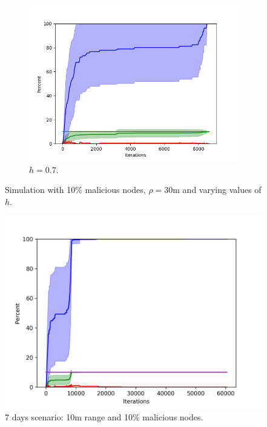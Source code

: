 \begin{figure}
\begin{subfigure}{0.5\textwidth}
\includegraphics[width=\linewidth]{images/plots/thresholds/07_30_10}
\caption{$h = 0.7$.} \label{fig:tarjan0}
\end{subfigure}

\caption{Simulation with 10\% malicious nodes, $\rho = 30$m and varying values of $h$.}
\label{fig:randomthresholds}
\end{figure}


\begin{figure}
\centering
\includegraphics[width=\textwidth]{images/plots/Network_rA7/10_10}
\caption{7 days scenario: 10m range and 10\% malicious nodes.} \label{fig:random7}
\end{figure}

